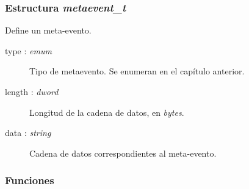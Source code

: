 \subsubsection{Estructura \textit{metaevent\_t}}

Define un meta-evento.

\begin{description}
	\item[type : \textit{emum}] Tipo de metaevento. Se enumeran en el capítulo anterior.
	\item[length : \textit{dword}] Longitud de la cadena de datos, en \textit{bytes}.
	\item[data : \textit{string}] Cadena de datos correspondientes al meta-evento.
\end{description}

\subsubsection{Funciones}

